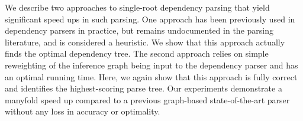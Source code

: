 We describe two approaches to single-root dependency parsing that yield significant speed ups in such parsing. One approach has been previously used in dependency parsers in practice, but remains undocumented in the parsing literature, and is considered a heuristic. We show that this approach actually finds the optimal dependency tree. The second approach relies on simple reweighting of the inference graph being input to the dependency parser and has an optimal running time. Here, we again show that this approach is fully correct and identifies the highest-scoring parse tree. Our experiments demonstrate a manyfold speed up compared to a previous graph-based state-of-the-art parser without any loss in accuracy or optimality.
